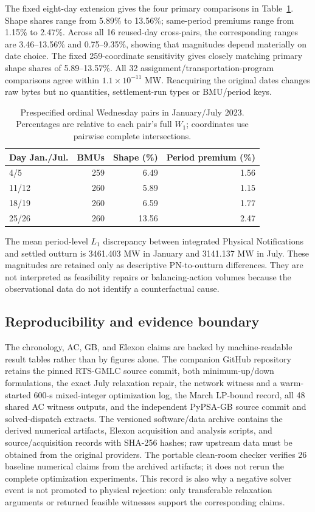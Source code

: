 \documentclass[journal]{IEEEtran}
\begin{document}
The fixed eight-day extension gives the four primary comparisons in Table~\ref{tab:elexon-sensitivity}. Shape shares range from 5.89\% to 13.56\%; same-period premiums range from 1.15\% to 2.47\%. Across all 16 reused-day cross-pairs, the corresponding ranges are 3.46--13.56\% and 0.75--9.35\%, showing that magnitudes depend materially on date choice. The fixed 259-coordinate sensitivity gives closely matching primary shape shares of 5.89--13.57\%. All 32 assignment/transportation-program comparisons agree within $1.1\times10^{-11}$ MW. Reacquiring the original dates changes raw bytes but no quantities, settlement-run types or BMU/period keys.

\begin{table}[t]
\caption{Prespecified ordinal Wednesday pairs in January/July 2023. Percentages are relative to each pair's full $W_1$; coordinates use pairwise complete intersections.}
\label{tab:elexon-sensitivity}
\centering
\footnotesize
\begin{tabular}{lrrr}
\toprule
Day Jan./Jul. & BMUs & Shape (\%) & Period premium (\%)\\
\midrule
4/5 & 259 & 6.49 & 1.56\\
11/12 & 260 & 5.89 & 1.15\\
18/19 & 260 & 6.59 & 1.77\\
25/26 & 260 & 13.56 & 2.47\\
\bottomrule
\end{tabular}
\end{table}


The mean period-level $L_1$ discrepancy between integrated Physical Notifications and settled outturn is 3461.403 MW in January and 3141.137 MW in July. These magnitudes are retained only as descriptive PN-to-outturn differences. They are not interpreted as feasibility repairs or balancing-action volumes because the observational data do not identify a counterfactual cause.

\subsection{Reproducibility and evidence boundary}
The chronology, AC, GB, and Elexon claims are backed by machine-readable result tables rather than by figures alone. The companion GitHub repository retains the pinned RTS-GMLC source commit, both minimum-up/down formulations, the exact July relaxation repair, the network witness and a warm-started 600-s mixed-integer optimization log, the March LP-bound record, all 48 shared AC witness outputs, and the independent PyPSA-GB source commit and solved-dispatch extracts. The versioned software/data archive contains the derived numerical artifacts, Elexon acquisition and analysis scripts, and source/acquisition records with SHA-256 hashes; raw upstream data must be obtained from the original providers. The portable clean-room checker verifies 26 baseline numerical claims from the archived artifacts; it does not rerun the complete optimization experiments. This record is also why a negative solver event is not promoted to physical rejection: only transferable relaxation arguments or returned feasible witnesses support the corresponding claims.
\end{document}
